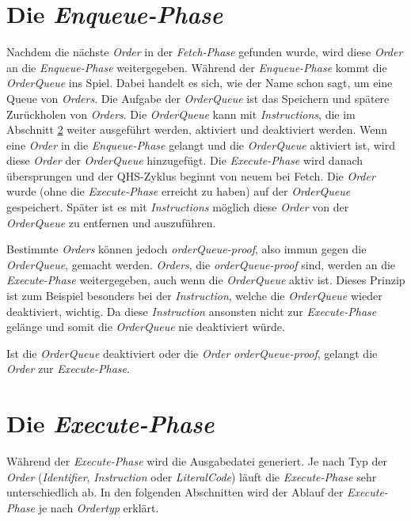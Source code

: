 \section{Die \textit{Enqueue-Phase}} \label{sec:qhs-Enqueue}
Nachdem die nächste \textit{Order} in der  \textit{Fetch-Phase} gefunden wurde, wird diese \textit{Order} an die \textit{Enqueue-Phase} weitergegeben. Während der \textit{Enqueue-Phase} kommt die \textit{OrderQueue} ins Spiel.
Dabei handelt es sich, wie der Name schon sagt, um eine Queue von \textit{Orders}.
Die Aufgabe der \textit{OrderQueue} ist das Speichern und spätere Zurückholen von \textit{Orders}.
Die \textit{OrderQueue} kann mit \textit{Instructions}, die im Abschnitt \ref{sec:qhs-execute} weiter ausgeführt werden, aktiviert und deaktiviert werden.
Wenn eine \textit{Order} in die \textit{Enqueue-Phase} gelangt und die \textit{OrderQueue} aktiviert ist, wird diese \textit{Order} der \textit{OrderQueue} hinzugefügt.
Die \textit{Execute-Phase} wird danach übersprungen und der QHS-Zyklus beginnt von neuem bei Fetch.
Die \textit{Order} wurde (ohne die \textit{Execute-Phase} erreicht zu haben) auf der \textit{OrderQueue} gespeichert.
Später ist es mit \textit{Instructions} möglich diese \textit{Order} von der \textit{OrderQueue} zu entfernen und auszuführen.

Bestimmte \textit{Orders} können jedoch \textit{orderQueue-proof}, also immun gegen die \textit{OrderQueue}, gemacht werden.
\textit{Orders}, die \textit{orderQueue-proof} sind, werden an die \textit{Execute-Phase} weitergegeben, auch wenn die \textit{OrderQueue} aktiv ist.
Dieses Prinzip ist zum Beispiel besonders bei der \textit{Instruction}, welche die \textit{OrderQueue} wieder deaktiviert, wichtig.
Da diese \textit{Instruction} ansonsten nicht zur \textit{Execute-Phase} gelänge und somit die \textit{OrderQueue} nie deaktiviert würde.



Ist die \textit{OrderQueue} deaktiviert oder die \textit{Order} \textit{orderQueue-proof}, gelangt die \textit{Order} zur \textit{Execute-Phase}.

\section{Die \textit{Execute-Phase}} \label{sec:qhs-execute}
Während der \textit{Execute-Phase} wird die Ausgabedatei generiert. Je nach Typ der \textit{Order} (\textit{Identifier}, \textit{Instruction} oder \textit{LiteralCode}) läuft die \textit{Execute-Phase} sehr unterschiedlich ab.
In den folgenden Abschnitten wird der Ablauf der \textit{Execute-Phase} je nach \textit{Ordertyp} erklärt.

